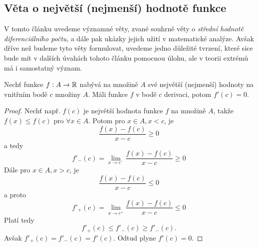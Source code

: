     \subsection{Věta o největší (nejmenší) hodnotě funkce}
      V tomto článku uvedeme významné věty, zvané souhrně věty o \emph{střední hodnotě 
      diferenciálního počtu}, a dále pak ukázky jejich užití v matematické analýze.  Avšak dříve 
      než budeme tyto věty formulovat, uvedeme jedno důležité tvrzení, které sice bude mít v 
      dalších úvahách tohoto článku pomocnou úlohu, ale v teorii extrémů má i samostatný význam. 
      \cite[s.~186]{Brabec1989} 
      \begin{lemma}\label{MA1:lem_diff02}
        Nechť funkce $f:A\rightarrow\mathbb{R}$ nabývá na množině $A$ své největší (nejmenší) hodnoty 
        na vnitřním bodě $c$ množiny $A$. Máli funkce $f$ v bodě $c$ derivaci, potom $f'(c)=0$.  
      \end{lemma}
      \begin{proof}
        Nechť např. $f(c)$ je největší hodnota funkce $f$ na množině $A$, takže $f(x)\leq f(c)$ pro
        $\forall x\in A$. Potom pro $x\in A, x<c$, je 
        $$\frac{f(x)-f(c)}{x-c}\geq 0$$
        a tedy
        $$f'_{-}(c)=\lim_{x\rightarrow c^-}\frac{f(x)-f(c)}{x-c}\geq0$$ 
        Dále pro $x\in A, x>c$, je
        $$\frac{f(x)-f(c)}{x-c}\leq 0$$ 
        a proto
        $$f'_{+}(c)=\lim_{x\rightarrow c^+}\frac{f(x)-f(c)}{x-c}\leq0$$
        Platí tedy
        $$f'_{+}(c)\leq f'_{-}(c)\geq f'_{-}(c).$$ 
        Avšak $f'_{+}(c)=f'_{-}(c)= f'(c)$. Odtud plyne $f'(c)=0$. 
      \end{proof}
      
